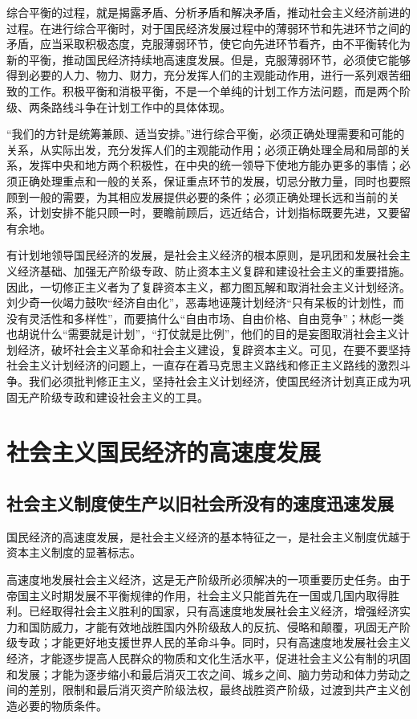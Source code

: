 \documentclass{book}
\begin{document}
综合平衡的过程，就是揭露矛盾、分析矛盾和解决矛盾，推动社会主义经济前进的过程。在进行综合平衡时，对于国民经济发展过程中的薄弱环节和先进环节之间的矛盾，应当采取积极态度，克服薄弱环节，使它向先进环节看齐，由不平衡转化为新的平衡，推动国民经济持续地高速度发展。但是，克服薄弱环节，必须使它能够得到必要的人力、物力、财力，充分发挥人们的主观能动作用，进行一系列艰苦细致的工作。积极平衡和消极平衡，不是一个单纯的计划工作方法问题，而是两个阶级、两条路线斗争在计划工作中的具体体现。

“我们的方针是统筹兼顾、适当安排。”进行综合平衡，必须正确处理需要和可能的关系，从实际出发，充分发挥人们的主观能动作用；必须正确处理全局和局部的关系，发挥中央和地方两个积极性，在中央的统一领导下使地方能办更多的事情；必须正确处理重点和一般的关系，保证重点环节的发展，切忌分散力量，同时也要照顾到一般的需要，为其相应发展提供必要的条件；必须正确处理长远和当前的关系，计划安排不能只顾一时，要瞻前顾后，远近结合，计划指标既要先进，又要留有余地。

有计划地领导国民经济的发展，是社会主义经济的根本原则，是巩团和发展社会主义经济基础、加强无产阶级专政、防止资本主义复辟和建设社会主义的重要措施。因此，一切修正主义者为了复辟资本主义，都力图瓦解和取消社会主义计划经济。刘少奇一伙竭力鼓吹“经济自由化”，恶毒地诬蔑计划经济“只有呆板的计划性，而没有灵活性和多样性”，而要搞什么“自由市场、自由价格、自由竞争”；林彪一类也胡说什么“需要就是计划”，“打仗就是比例”，他们的目的是妄图取消社会主义计划经济，破坏社会主义革命和社会主义建设，复辟资本主义。可见，在要不要坚持社会主义计划经济的问题上，一直存在着马克思主义路线和修正主义路线的激烈斗争。我们必须批判修正主义，坚持社会主义计划经济，使国民经济计划真正成为巩固无产阶级专政和建设社会主义的工具。

\section{社会主义国民经济的高速度发展}

\subsection{社会主义制度使生产以旧社会所没有的速度迅速发展}

国民经济的高速度发展，是社会主义经济的基本特征之一，是社会主义制度优越于资本主义制度的显著标志。

高速度地发展社会主义经济，这是无产阶级所必须解决的一项重要历史任务。由于帝国主义时期发展不平衡规律的作用，社会主义只能首先在一国或几国内取得胜利。已经取得社会主义胜利的国家，只有高速度地发展社会主义经济，增强经济实力和国防威力，才能有效地战胜国内外阶级敌人的反抗、侵略和颠覆，巩固无产阶级专政；才能更好地支援世界人民的革命斗争。同时，只有高速度地发展社会主义经济，才能逐步提高人民群众的物质和文化生活水平，促进社会主义公有制的巩固和发展；才能为逐步缩小和最后消灭工农之间、城乡之间、脑力劳动和体力劳动之间的差别，限制和最后消灭资产阶级法权，最终战胜资产阶级，过渡到共产主义创造必要的物质条件。
\end{document}

